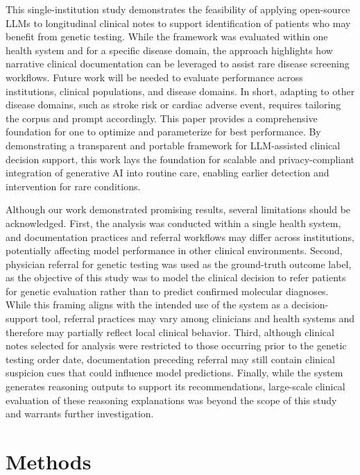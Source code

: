 \documentclass[fleqn,10pt]{wlscirep}
\begin{document}
This single-institution study demonstrates the feasibility of applying open-source LLMs to longitudinal clinical notes to support identification of patients who may benefit from genetic testing. While the framework was evaluated within one health system and for a specific disease domain, the approach highlights how narrative clinical documentation can be leveraged to assist rare disease screening workflows. Future work will be needed to evaluate performance across institutions, clinical populations, and disease domains. In short, adapting to other disease domains, such as stroke risk or cardiac adverse event, requires tailoring the corpus and prompt accordingly. This paper provides a comprehensive foundation for one to optimize and parameterize for best performance. By demonstrating a transparent and portable framework for LLM-assisted clinical decision support, this work lays the foundation for scalable and privacy-compliant integration of generative AI into routine care, enabling earlier detection and intervention for rare conditions.

Although our work demonstrated promising results, several limitations should be acknowledged. First, the analysis was conducted within a single health system, and documentation practices and referral workflows may differ across institutions, potentially affecting model performance in other clinical environments. Second, physician referral for genetic testing was used as the ground-truth outcome label, as the objective of this study was to model the clinical decision to refer patients for genetic evaluation rather than to predict confirmed molecular diagnoses. While this framing aligns with the intended use of the system as a decision-support tool, referral practices may vary among clinicians and health systems and therefore may partially reflect local clinical behavior. Third, although clinical notes selected for analysis were restricted to those occurring prior to the genetic testing order date, documentation preceding referral may still contain clinical suspicion cues that could influence model predictions. Finally, while the system generates reasoning outputs to support its recommendations, large-scale clinical evaluation of these reasoning explanations was beyond the scope of this study and warrants further investigation.

\section*{Methods}
\end{document}

